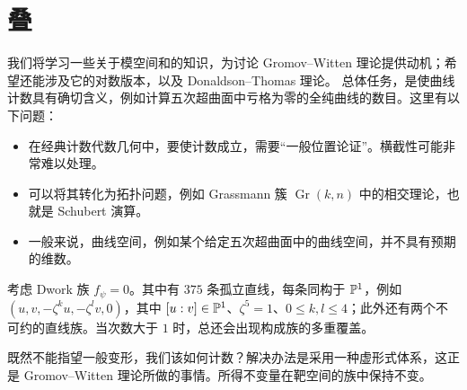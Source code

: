 \chapter{叠}
我们将学习一些关于模空间和的知识，为讨论 Gromov–Witten 理论提供动机；希望还能涉及它的对数版本，以及 Donaldson–Thomas 理论。
总体任务，是使曲线计数具有确切含义，例如计算五次超曲面中亏格为零的全纯曲线的数目。这里有以下问题：
\begin{itemize}
\item 在经典计数代数几何中，要使计数成立，需要“一般位置论证”。横截性可能非常难以处理。
\item 可以将其转化为拓扑问题，例如 Grassmann 簇 $\operatorname{Gr}(k,n)$ 中的相交理论，也就是 Schubert 演算。
\item 一般来说，曲线空间，例如某个给定五次超曲面中的曲线空间，并不具有预期的维数。
\end{itemize}
\begin{example}\label{ex:2.1}
考虑 Dwork 族 $f_\psi=0$。其中有 $375$ 条孤立直线，每条同构于 $\mathbb P^1$，例如
$(u,v,-\zeta^ku,-\zeta^lv,0)$，其中 $[u:v]\in\mathbb P^1$、$\zeta^5=1$、$0\le k,l\le4$；此外还有两个不可约的直线族。当次数大于 $1$ 时，总还会出现构成族的多重覆盖。
\end{example}
既然不能指望一般变形，我们该如何计数？解决办法是采用一种虚形式体系，这正是 Gromov–Witten 理论所做的事情。所得不变量在靶空间的族中保持不变。
